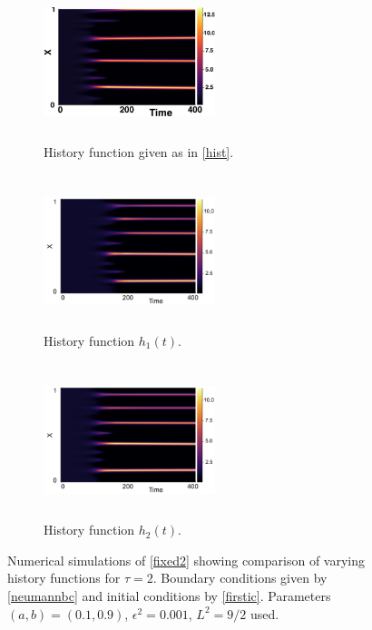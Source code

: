 \begin{figure}[H]
    \centering
    \begin{subfigure}[t]{0.32\textwidth}
        \centering
        \includegraphics[width=5cm,height=4.5cm]{ic22.png}
        \caption{History function given as in \eqref{hist}.}
        \label{}
    \end{subfigure}
    \hfill
    \begin{subfigure}[t]{0.32\textwidth}
        \centering
        \includegraphics[width=5cm,height=4.5cm]{h12.png}
        \caption{History function $h_1(t)$.}
        \label{}
    \end{subfigure}
    \hfill
    \begin{subfigure}[t]{0.32\textwidth}
        \centering
        \includegraphics[width=5cm,height=4.5cm]{h22.png}
        \caption{History function $h_2(t)$.}
        \label{}
    \end{subfigure}
    \caption{Numerical simulations of \eqref{fixed2} showing comparison of varying history functions for $\tau=2$. Boundary conditions given by \eqref{neumannbc} and initial conditions by \eqref{firstic}. Parameters $(a,b)=(0.1,0.9)$, $\epsilon^2=0.001$, $L^2=9/2$ used.}
    \label{fig:temp2}
\end{figure}
